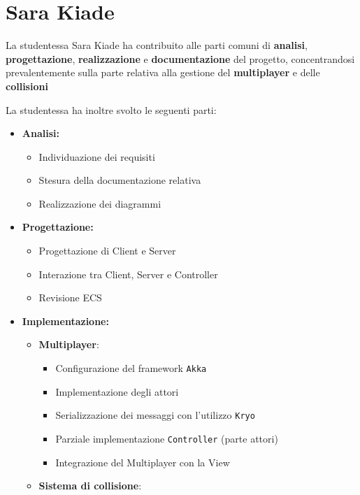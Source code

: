 \section{Sara Kiade}
La studentessa Sara Kiade ha contribuito alle parti comuni di \textbf{analisi}, \textbf{progettazione}, \textbf{realizzazione} e \textbf{documentazione} del progetto, concentrandosi prevalentemente sulla parte relativa alla gestione del \textbf{multiplayer} e delle \textbf{collisioni} 

La studentessa ha inoltre svolto le seguenti parti:

\begin{itemize}
    \item \textbf{Analisi:}
        \begin{itemize}
            \item Individuazione dei requisiti
            \item Stesura della documentazione relativa
            \item Realizzazione dei diagrammi
        \end{itemize}
    \item \textbf{Progettazione:}
        \begin{itemize}
            \item Progettazione di Client e Server
            \item Interazione tra Client, Server e Controller
            \item Revisione ECS
        \end{itemize}
    \item \textbf{Implementazione:}
        \begin{itemize}
            \item \textbf{Multiplayer}:
                \begin{itemize}
                    \item Configurazione del framework \texttt{Akka}
                    \item Implementazione degli attori
                    \item Serializzazione dei messaggi con l'utilizzo \texttt{Kryo}
                    \item Parziale implementazione \texttt{Controller} (parte attori)
                    \item Integrazione del Multiplayer con la View
                \end{itemize}
            \item \textbf{Sistema di collisione}: 

\end{itemize}
\end{itemize}
